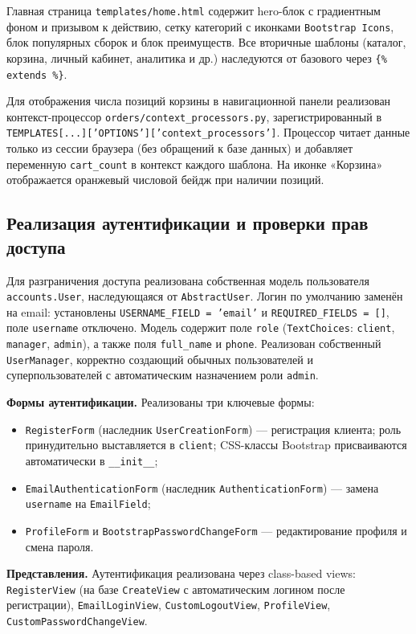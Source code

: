 \documentclass[14pt, a4paper]{extarticle}
\begin{document}
Главная страница \texttt{templates/home.html} содержит hero-блок с градиентным фоном и призывом к действию, сетку категорий с иконками \texttt{Bootstrap Icons}, блок популярных сборок и блок преимуществ. Все вторичные шаблоны (каталог, корзина, личный кабинет, аналитика и др.) наследуются от базового через \texttt{\{\% extends \%\}}.

Для отображения числа позиций корзины в навигационной панели реализован контекст-процессор \texttt{orders/context\_processors.py}, зарегистрированный в \texttt{TEMPLATES[...]['OPTIONS']['context\_processors']}. Процессор читает данные только из сессии браузера (без обращений к базе данных) и добавляет переменную \texttt{cart\_count} в контекст каждого шаблона. На иконке «Корзина» отображается оранжевый числовой бейдж при наличии позиций.

\subsection{Реализация аутентификации и проверки прав доступа}

Для разграничения доступа реализована собственная модель пользователя \texttt{accounts.User}, наследующаяся от \texttt{AbstractUser}. Логин по умолчанию заменён на email: установлены \texttt{USERNAME\_FIELD = 'email'} и \texttt{REQUIRED\_FIELDS = []}, поле \texttt{username} отключено. Модель содержит поле \texttt{role} (\texttt{TextChoices}: \texttt{client}, \texttt{manager}, \texttt{admin}), а также поля \texttt{full\_name} и \texttt{phone}. Реализован собственный \texttt{UserManager}, корректно создающий обычных пользователей и суперпользователей с автоматическим назначением роли \texttt{admin}.

\textbf{Формы аутентификации.} Реализованы три ключевые формы:
\begin{itemize}
    \item \texttt{RegisterForm} (наследник \texttt{UserCreationForm}) --- регистрация клиента; роль принудительно выставляется в \texttt{client}; CSS-классы Bootstrap присваиваются автоматически в \texttt{\_\_init\_\_};
    \item \texttt{EmailAuthenticationForm} (наследник \texttt{AuthenticationForm}) --- замена \texttt{username} на \texttt{EmailField};
    \item \texttt{ProfileForm} и \texttt{BootstrapPasswordChangeForm} --- редактирование профиля и смена пароля.
\end{itemize}

\textbf{Представления.} Аутентификация реализована через class-based views: \texttt{RegisterView} (на базе \texttt{CreateView} с автоматическим логином после регистрации), \texttt{EmailLoginView}, \texttt{CustomLogoutView}, \texttt{ProfileView}, \texttt{CustomPasswordChangeView}.
\end{document}
